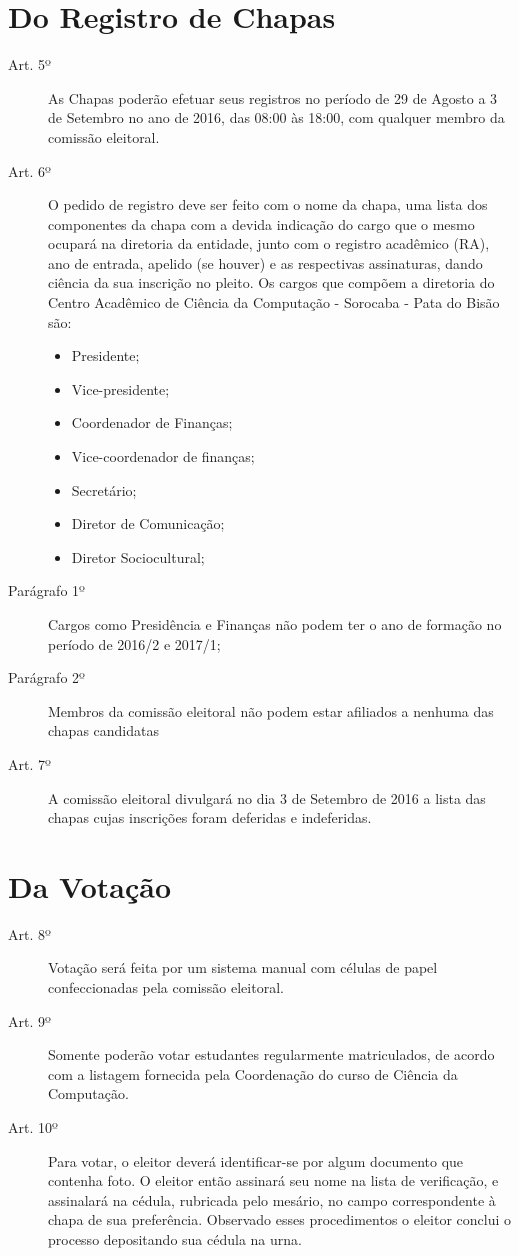 \documentclass[12pt]{article}
\newcommand\tab[1][1cm]{\hspace*{#1}}
\begin{document}
\section*{Do Registro de Chapas}
\begin{description}
	\item[Art. 5º] As Chapas poderão efetuar seus registros no período de 29 de Agosto a 3 de Setembro no ano de 2016, das 08:00 às 18:00, com qualquer membro da comissão eleitoral.
	\item[Art. 6º] O pedido de registro deve ser feito com o nome da chapa, uma lista dos componentes da chapa com a devida indicação do cargo que o mesmo ocupará na diretoria da entidade, junto com o registro acadêmico (RA), ano de entrada, apelido (se houver) e as respectivas assinaturas, dando ciência da sua inscrição no pleito.
Os cargos que compõem a diretoria do Centro Acadêmico de Ciência da Computação - Sorocaba - Pata do Bisão são:
\begin{itemize}	
	\item Presidente;
	\item Vice-presidente;
	\item Coordenador de Finanças;
	\item Vice-coordenador de finanças;
	\item Secretário;
        \item Diretor de Comunicação;
	\item Diretor Sociocultural;
\end{itemize}
	\tab \item[Parágrafo 1º] Cargos como Presidência e Finanças não podem ter o ano de formação no período de 2016/2 e 2017/1;
	\tab \item[Parágrafo 2º] Membros da comissão eleitoral não podem estar afiliados a nenhuma das chapas candidatas
	\item[Art. 7º] A comissão eleitoral divulgará no dia 3 de Setembro de 2016 a lista das chapas cujas inscrições foram deferidas e indeferidas.
\end{description}

\section*{Da Votação}
\begin{description}
	\item[Art. 8º] Votação será feita por um sistema manual com células de papel confeccionadas pela comissão eleitoral.
	\item[Art. 9º] Somente poderão votar estudantes regularmente matriculados, de acordo com a listagem fornecida pela Coordenação do curso de Ciência da Computação.
	\item[Art. 10º] Para votar, o eleitor deverá identificar-se por algum documento que contenha foto. O eleitor então assinará seu nome na lista de verificação, e assinalará na cédula, rubricada pelo mesário, no campo correspondente à chapa de sua preferência. Observado esses procedimentos o eleitor conclui o processo depositando sua cédula na urna.
\end{description}
\end{document}
